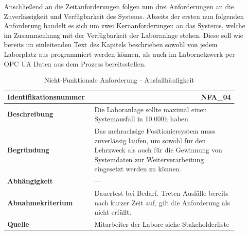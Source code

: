 \documentclass[../../../Bachelorarbeit.tex]{subfiles}
\begin{document}
Anschließend an die Zeitanforderungen folgen nun drei Anforderungen an die Zuverlässigkeit und Verfügbarkeit des Systems. Abseits der ersten nun folgenden Anforderung handelt es sich um zwei Kernanforderungen an das Systems, welche im Zusammenhang mit der Verfügbarkeit der Laboranlage stehen. Diese soll wie bereits im einleitenden Text des Kapitels beschrieben sowohl von jedem Laborplatz aus programmiert werden können, als auch im Labornetzwerk per OPC UA Daten aus dem Prozess bereitsstellen.

\begin{table}[H]
    \centering
    \begin{tabular}{ p{0.34\linewidth}  p{0.6\linewidth} }
        \hline
        \textbf{Identifikationsnummer}  & \multicolumn{1}{r}{NFA\_04} \\ \hline
        \textbf{Beschreibung}           & Die Laboranlage sollte maximal einen Systemausfall in 10.000h haben. \\
        \textbf{Begründung}             & Das mehrachsige Positioniersystem muss zuverlässig laufen, um sowohl für den Lehrzweck als auch für die Gewinnung von Systemdaten zur Weiterverarbeitung eingesetzt werden zu können. \\
        \textbf{Abhängigkeit}           & --- \\
        \textbf{Abnahmekriterium}       & Dauertest bei Bedarf. Treten Ausfälle bereits nach kurzer Zeit auf, gilt die Anforderung als nicht erfüllt. \\
        \textbf{Quelle}                 & Mitarbeiter der Labore siehe Stakeholderliste \\ \hline
    \end{tabular}
    \caption[\acs{nfa} - Ausfallhäufigkeit]{Nicht-Funktionale Anforderung - Ausfallhäufigkeit}
    \label{tab:my-table10}
\end{table}
\end{document}
